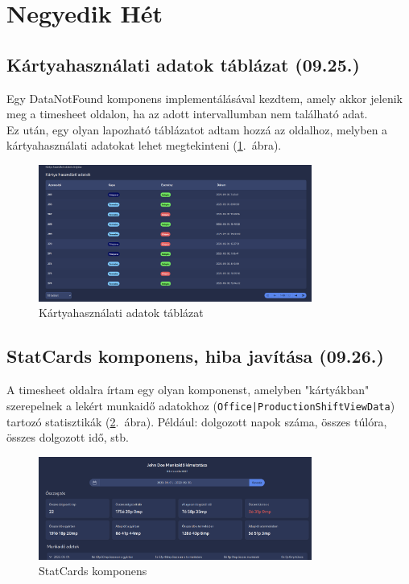 \documentclass[a4paper]{article}
\newcommand{\inltxt}[1]{\texttt{#1}}
\begin{document}
\section{Negyedik Hét}

\subsection{Kártyahasználati adatok táblázat (09.25.)}

Egy DataNotFound komponens implementálásával kezdtem, amely akkor jelenik meg a timesheet
oldalon, ha az adott intervallumban nem található adat.\\

Ez után, egy olyan lapozható táblázatot adtam hozzá az oldalhoz, melyben a kártyahasználati adatokat
lehet megtekinteni (\ref{fig:card_usages_table}.~ábra).

\begin{figure}[ht]
  \centering
  \includegraphics[width = 0.8\textwidth]{images/card_usages_table.png}
  \caption{Kártyahasználati adatok táblázat}
  \label{fig:card_usages_table}
\end{figure}

\subsection{StatCards komponens, hiba javítása (09.26.)}

A timesheet oldalra írtam egy olyan komponenst, amelyben "kártyákban" szerepelnek a lekért
munkaidő adatokhoz (\inltxt{Office|ProductionShiftViewData}) tartozó statisztikák (\ref{fig:stat_cards}.~ábra). Például:
dolgozott napok száma, összes túlóra, összes dolgozott idő, stb.\\

\begin{figure}[ht]
  \centering
  \includegraphics[width = 0.8\textwidth]{images/stat_cards.png}
  \caption{StatCards komponens}
  \label{fig:stat_cards}
\end{figure}
\end{document}
